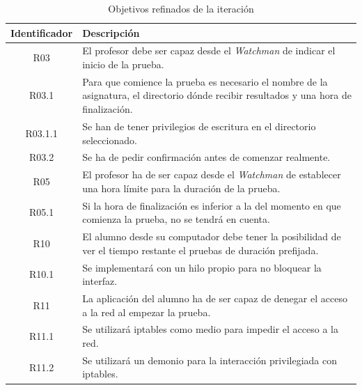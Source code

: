 \begin{table}
    \begin{tabular}{|c|p{12cm}|}
    \hline
    \textbf{Identificador} & \textbf{Descripción}
    \\ \hline

    R03 & El profesor debe ser capaz desde el \emph{Watchman} de indicar el inicio de la prueba.
    \\ \hline

    R03.1 & Para que comience la prueba es necesario el nombre de la asignatura, el directorio dónde recibir resultados y una hora de finalización.
    \\ \hline

    R03.1.1 & Se han de tener privilegios de escritura en el directorio seleccionado.
    \\ \hline

    R03.2 & Se ha de pedir confirmación antes de comenzar realmente.
    \\ \hline

    R05 & El profesor ha de ser capaz desde el \emph{Watchman} de establecer una hora límite para la duración de la prueba.
    \\ \hline

    R05.1 & Si la hora de finalización es inferior a la del momento en que comienza la prueba, no se tendrá en cuenta.
    \\ \hline

    R10 & El alumno desde su computador debe tener la posibilidad de ver el tiempo restante el pruebas de duración prefijada.
    \\ \hline

    R10.1 & Se implementará con un hilo propio para no bloquear la interfaz.
    \\ \hline

    R11 & La aplicación del alumno ha de ser capaz de denegar el acceso a la red al empezar la prueba.
    \\ \hline

    R11.1 & Se utilizará iptables como medio para impedir el acceso a la red.
    \\ \hline

    R11.2 & Se utilizará un demonio para la interacción privilegiada con iptables.
    \\ \hline

    \end{tabular}
    \caption{Objetivos refinados de la iteración}
    \label{tabla:objetivosRefinadosIteracion}
\end{table}


